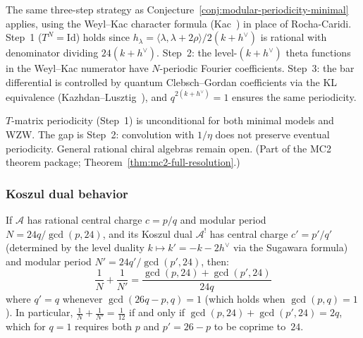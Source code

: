 \begin{evidence}
The same three-step strategy as Conjecture~\ref{conj:modular-periodicity-minimal} applies, using the Weyl--Kac character formula (Kac~\cite[\S12.7]{Kac}) in place of Rocha-Caridi.  Step~1 ($T^N = \mathrm{Id}$) holds since $h_\lambda = \langle \lambda, \lambda + 2\rho\rangle / 2(k+h^\vee)$ is rational with denominator dividing $24(k+h^\vee)$.  Step~2: the level-$(k+h^\vee)$ theta functions in the Weyl--Kac numerator have $N$-periodic Fourier coefficients.  Step~3: the bar differential is controlled by quantum Clebsch--Gordan coefficients via the KL equivalence (Kazhdan--Lusztig~\cite{KL93}), and $q^{2(k+h^\vee)}=1$ ensures the same periodicity.
\end{evidence}

\begin{remark}[Scope]\label{rem:wzw-periodicity-scope}
$T$-matrix periodicity (Step~1) is unconditional for both minimal
models and WZW.  The gap is Step~2: convolution with $1/\eta$ does
not preserve eventual periodicity.  General rational chiral algebras
remain open.
(Part of the MC2 theorem package; Theorem~\ref{thm:mc2-full-resolution}.)
\end{remark}

\subsubsection{Koszul dual behavior}

\begin{conjecture}\label{conj:reflected-modular-periodicity}
If $\mathcal{A}$ has rational central charge $c = p/q$ and modular period $N = 24q/\gcd(p,24)$, and its Koszul dual $\mathcal{A}^!$ has central charge $c' = p'/q'$ (determined by the level duality $k \mapsto k' = -k - 2h^\vee$ via the Sugawara formula) and modular period $N' = 24q'/\gcd(p',24)$, then:
\begin{equation}\label{eq:period-sum}
\frac{1}{N} + \frac{1}{N'} = \frac{\gcd(p,24) + \gcd(p',24)}{24q}
\end{equation}
where $q' = q$ whenever $\gcd(26q - p, q) = 1$ (which holds when $\gcd(p,q) = 1$).
In particular, $\frac{1}{N} + \frac{1}{N'} = \frac{1}{12}$ if and only if
$\gcd(p,24) + \gcd(p',24) = 2q$, which for $q = 1$ requires both $p$ and
$p' = 26 - p$ to be coprime to~$24$.
\end{conjecture}

